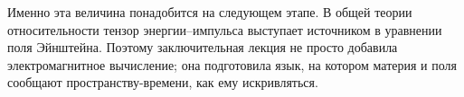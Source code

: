 Именно эта величина понадобится на следующем этапе. В общей теории относительности тензор энергии--импульса выступает источником в уравнении поля Эйнштейна. Поэтому заключительная лекция не просто добавила электромагнитное вычисление; она подготовила язык, на котором материя и поля сообщают пространству-времени, как ему искривляться.